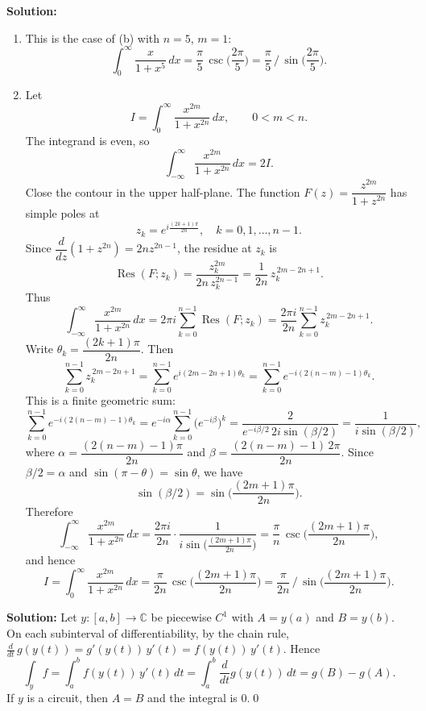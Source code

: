 \noindent\textbf{Solution:}
\begin{enumerate}[label=(\alph*)]
\item This is the case of (b) with $n=5$, $m=1$:
\[\int_0^{\infty}\frac{x}{1+x^5}\,dx=\frac{\pi}{5}\,\csc\!\Big(\frac{2\pi}{5}\Big)=\frac{\pi}{5}\,\Big/\,\sin\!\Big(\frac{2\pi}{5}\Big).\]

\item Let
\[I=\int_0^{\infty}\frac{x^{2m}}{1+x^{2n}}\,dx,\qquad 0<m<n.\]
The integrand is even, so
\[\int_{-\infty}^{\infty}\frac{x^{2m}}{1+x^{2n}}\,dx=2I.\]
Close the contour in the upper half-plane. The function $F(z)=\dfrac{z^{2m}}{1+z^{2n}}$ has simple poles at
\[z_k=e^{i\frac{(2k+1)\pi}{2n}},\quad k=0,1,\dots,n-1.\]
Since $\dfrac{d}{dz}(1+z^{2n})=2n z^{2n-1}$, the residue at $z_k$ is
\[\operatorname{Res}(F;z_k)=\frac{z_k^{2m}}{2n\,z_k^{2n-1}}=\frac{1}{2n}\,z_k^{\,2m-2n+1}.\]
Thus
\[\int_{-\infty}^{\infty}\frac{x^{2m}}{1+x^{2n}}\,dx=2\pi i\sum_{k=0}^{n-1}\operatorname{Res}(F;z_k)=\frac{2\pi i}{2n}\sum_{k=0}^{n-1} z_k^{\,2m-2n+1}.\]
Write $\theta_k=\dfrac{(2k+1)\pi}{2n}$. Then
\[\sum_{k=0}^{n-1} z_k^{\,2m-2n+1}=\sum_{k=0}^{n-1} e^{i(2m-2n+1)\theta_k}=\sum_{k=0}^{n-1} e^{-i(2(n-m)-1)\theta_k}.
\]
This is a finite geometric sum:
\[\sum_{k=0}^{n-1} e^{-i(2(n-m)-1)\theta_k}=e^{-i\alpha}\sum_{k=0}^{n-1} \Big(e^{-i\beta}\Big)^k=\frac{2}{e^{-i\beta/2}\,2i\sin(\beta/2)}=\frac{1}{i\sin(\beta/2)},\]
where $\alpha=\dfrac{(2(n-m)-1)\pi}{2n}$ and $\beta=\dfrac{(2(n-m)-1)\,2\pi}{2n}$. Since $\beta/2=\alpha$ and $\sin(\pi-\theta)=\sin\theta$, we have
\[\sin(\beta/2)=\sin\!\Big(\frac{(2m+1)\pi}{2n}\Big).\]
Therefore
\[\int_{-\infty}^{\infty}\frac{x^{2m}}{1+x^{2n}}\,dx=\frac{2\pi i}{2n}\cdot\frac{1}{i\sin\!\big(\frac{(2m+1)\pi}{2n}\big)}=\frac{\pi}{n}\,\csc\!\Big(\frac{(2m+1)\pi}{2n}\Big),\]
and hence
\[I=\int_0^{\infty}\frac{x^{2m}}{1+x^{2n}}\,dx=\frac{\pi}{2n}\,\csc\!\Big(\frac{(2m+1)\pi}{2n}\Big)=\frac{\pi}{2n}\,\Big/\,\sin\!\Big(\frac{(2m+1)\pi}{2n}\Big).\]
\end{enumerate}

\noindent\textbf{Solution:}
Let $y:[a,b]\to\mathbb C$ be piecewise $C^1$ with $A=y(a)$ and $B=y(b)$. On each subinterval of differentiability, by the chain rule, $\frac{d}{dt}\,g(y(t))=g'(y(t))\,y'(t)=f(y(t))\,y'(t)$. Hence
\[\int_y f=\int_a^b f(y(t))\,y'(t)\,dt=\int_a^b \frac{d}{dt}g(y(t))\,dt=g(B)-g(A).\]
If $y$ is a circuit, then $A=B$ and the integral is $0$.\qed


